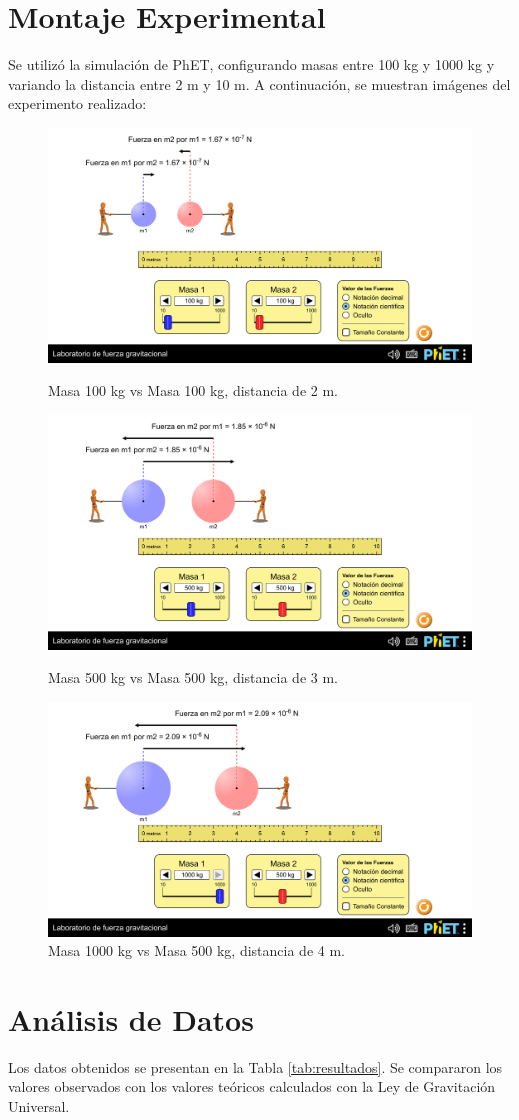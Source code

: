 \documentclass[a4paper,12pt]{article}
\begin{document}
\newpage
\section{Montaje Experimental}
Se utilizó la simulación de PhET, configurando masas entre 100 kg y 1000 kg y variando la distancia entre 2 m y 10 m. A continuación, se muestran imágenes del experimento realizado:

\begin{figure}[h]
    \centering
    \includegraphics[width=0.55\linewidth]{m1_100_m2_100_r_2.png}
    \caption{Masa 100 kg vs Masa 100 kg, distancia de 2 m.}
    
    \vspace{0.5cm}

    \includegraphics[width=0.55\linewidth]{m1_500_m2_500_r_3.png}
    \caption{Masa 500 kg vs Masa 500 kg, distancia de 3 m.}

    \vspace{0.5cm}

    \includegraphics[width=0.55\linewidth]{m1_1000_m2_500_r_4.png}
    \caption{Masa 1000 kg vs Masa 500 kg, distancia de 4 m.}

\end{figure}

\newpage
\section{Análisis de Datos}
Los datos obtenidos se presentan en la Tabla \ref{tab:resultados}. Se compararon los valores observados con los valores teóricos calculados con la Ley de Gravitación Universal.
\end{document}
